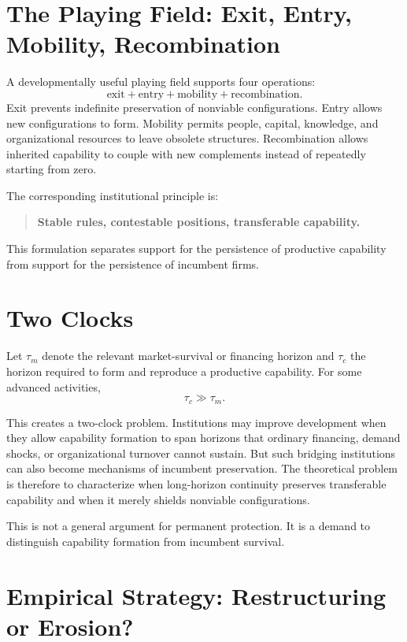 \documentclass[11pt]{article}
\begin{document}
\section{The Playing Field: Exit, Entry, Mobility, Recombination}

A developmentally useful playing field supports four operations:
\[
\text{exit}+\text{entry}+\text{mobility}+\text{recombination}.
\]
Exit prevents indefinite preservation of nonviable configurations. Entry allows new configurations to form. Mobility permits people, capital, knowledge, and organizational resources to leave obsolete structures. Recombination allows inherited capability to couple with new complements instead of repeatedly starting from zero.

The corresponding institutional principle is:

\begin{quote}
\textbf{Stable rules, contestable positions, transferable capability.}
\end{quote}

This formulation separates support for the persistence of productive capability from support for the persistence of incumbent firms.

\section{Two Clocks}

Let $\tau_m$ denote the relevant market-survival or financing horizon and $\tau_c$ the horizon required to form and reproduce a productive capability. For some advanced activities,
\[
\tau_c \gg \tau_m.
\]

This creates a two-clock problem. Institutions may improve development when they allow capability formation to span horizons that ordinary financing, demand shocks, or organizational turnover cannot sustain. But such bridging institutions can also become mechanisms of incumbent preservation. The theoretical problem is therefore to characterize when long-horizon continuity preserves transferable capability and when it merely shields nonviable configurations.

This is not a general argument for permanent protection. It is a demand to distinguish capability formation from incumbent survival.

\section{Empirical Strategy: Restructuring or Erosion?}
\end{document}
